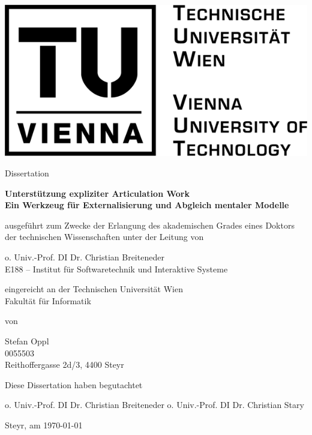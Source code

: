 \begin{titlepage}
	{
	\centering

	\includegraphics[width=.2\textwidth]{img/tu_logo.png}

	\vspace{1cm}

	\Large Dissertation
	
	\vspace{0.5cm}
	
	\textsf{
	\Large \textbf{Unterstützung expliziter Articulation Work}\\	
	\large \textbf{Ein Werkzeug für Externalisierung und Abgleich mentaler Modelle}
	}

	\vspace{1cm}
	
	\normalsize ausgeführt zum Zwecke der Erlangung des akademischen Grades eines Doktors der technischen Wissenschaften unter der Leitung von

	\vspace{0.3cm}

	o. Univ.-Prof. DI Dr. Christian Breiteneder\\\normalsize E188 -- Institut für Softwaretechnik und Interaktive Systeme

	\vspace{0.5cm}

	eingereicht an der Technischen Universität Wien\\Fakultät für Informatik

	\vspace{0.8cm}

	von

	\vspace{0.3cm}

	Stefan Oppl\\\normalsize 0055503\\Reithoffergasse 2d/3, 4400 Steyr
	
	\vspace{1cm}
	
	Diese Dissertation haben begutachtet
	
	\vspace{1.5cm}
	\small o. Univ.-Prof. DI Dr. Christian Breiteneder \hspace{1cm} o. Univ.-Prof. DI Dr. Christian Stary

	\vspace{1.8cm}
	}
	\normalsize Steyr, am \today
	
\end{titlepage}